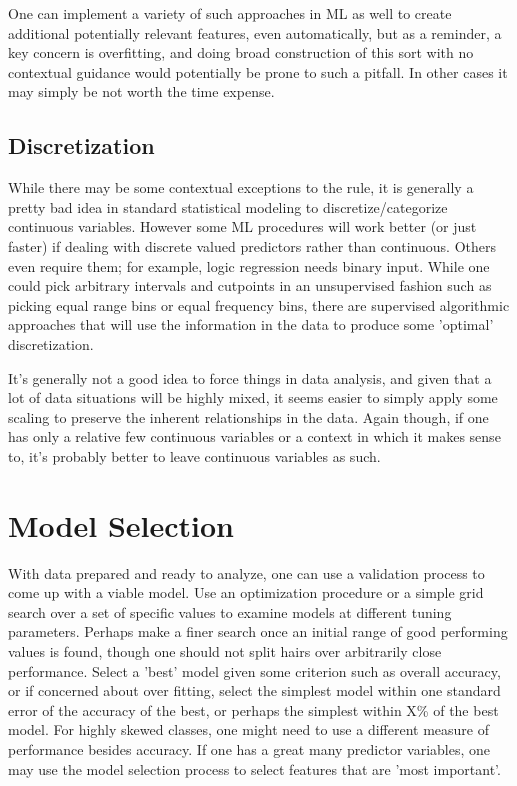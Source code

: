 \documentclass[english,nohyper,titlepage]{tufte-handout}
\begin{document}
One can implement a variety of such approaches in ML as well to create additional potentially relevant features, even automatically, but as a reminder, a key concern is overfitting, and doing broad construction of this sort with no contextual guidance would potentially be prone to such a pitfall.  In other cases it may simply be not worth the time expense.

\subsection{Discretization}
While there may be some contextual exceptions to the rule, it is generally a pretty bad idea in standard statistical modeling to discretize/categorize continuous variables.  However some ML procedures will work better (or just faster) if dealing with discrete valued predictors rather than continuous. Others even require them; for example, logic regression needs binary input.  While one could pick arbitrary intervals and cutpoints in an unsupervised fashion such as picking equal range bins or equal frequency bins, there are supervised algorithmic approaches that will use the information in the data to produce some 'optimal' discretization.

It's generally not a good idea to force things in data analysis, and given that a lot of data situations will be highly mixed, it seems easier to simply apply some scaling to preserve the inherent relationships in the data.  Again though, if one has only a relative few continuous variables or a context in which it makes sense to, it's probably better to leave continuous variables as such.

\section{Model Selection}
With data prepared and ready to analyze, one can use a validation process to come up with a viable model.  Use an optimization procedure or a simple grid search over a set of specific values to examine models at different tuning parameters. Perhaps make a finer search once an initial range of good performing values is found, though one should not split hairs over arbitrarily close performance.  Select a 'best' model given some criterion such as overall accuracy, or if concerned about over fitting, select the simplest model within one standard error of the accuracy of the best, or perhaps the simplest within X\% of the best model.  For highly skewed classes, one might need to use a different measure of performance besides accuracy.  If one has a great many predictor variables, one may use the model selection process to select features that are 'most important'.
\end{document}
